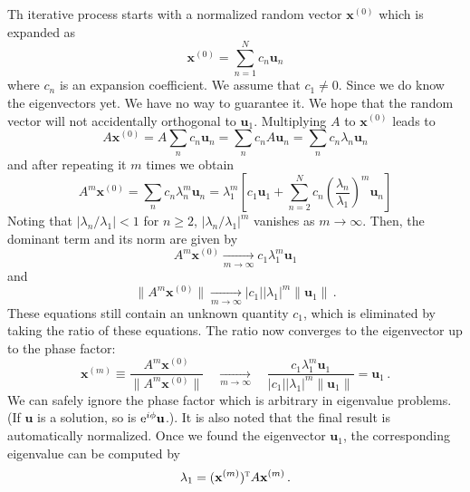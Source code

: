 Th iterative process starts with a normalized random vector $\mathbf{x}^{(0)}$ which is expanded as
\begin{equation}
\mathbf{x}^{(0)}= \sum_{n=1}^N c_n \mathbf{u}_n
\end{equation}
where $c_n$ is an expansion coefficient.  We assume that $c_1 \ne 0$.  Since we do know the eigenvectors yet.  We have no way to guarantee it.
We hope that the random vector will not accidentally orthogonal to $\mathbf{u}_1$.  Multiplying $A$ to $\mathbf{x}^{(0)}$ leads to
\begin{equation}
A \mathbf{x}^{(0)} = A \sum_n c_n \mathbf{u}_n = \sum_n c_n A \mathbf{u}_n = \sum_n c_n \lambda_n \mathbf{u}_n
\end{equation}
and after repeating it $m$ times we obtain
\begin{equation}
A^m \mathbf{x}^{(0)} = \sum_n c_n \lambda_n^m \mathbf{u}_n= \lambda_1^m \left [ c_1 \mathbf{u}_1 + \sum_{n=2}^N c_n \left ( \frac{\lambda_n}{\lambda_1} \right )^m
\mathbf{u}_n \right ]
\end{equation}
Noting that $|\lambda_n/\lambda_1|<1$ for $n\geq 2$, $|\lambda_n/\lambda_1|^m$ vanishes as $m \rightarrow \infty$.  Then, the dominant term and its norm are given by
\begin{equation}\label{eq:eigen_power}
A^m \mathbf{x}^{(0)} \xrightarrow[m \rightarrow \infty]{} c_1 \lambda_1^m \mathbf{u}_1
\end{equation}
and
\begin{equation}\label{eq:eqigen_power_norm}
\| A^m \mathbf{x}^{(0)}\| \xrightarrow[m \rightarrow \infty]{} |c_1| |\lambda_1|^m \|\mathbf{u}_1\|\,.
\end{equation}
These equations still contain an unknown quantity $c_1$, which is eliminated by taking the ratio of these equations.  The ratio now converges to the eigenvector up to the phase factor: 
\begin{equation}
\mathbf{x}^{(m)} \equiv \frac{A^m \mathbf{x}^{(0)}}{\|A^{m}\mathbf{x}^{(0)}\|} \quad
\xrightarrow[m \rightarrow \infty]{} \quad
\frac{c_1 \lambda_1^m \mathbf{u}_1}{|c_1| |\lambda_1|^m \|\mathbf{u}_1\|} 
= \mathbf{u}_1\,.
\end{equation}
We can safely ignore the phase factor which is arbitrary in eigenvalue problems. (If $\mathbf{u}$ is a solution, so is $\text{e}^{i \phi} \mathbf{u}$.).   It is also noted that the final result is automatically normalized. 
Once we found the eigenvector $\mathbf{u}_1$, the corresponding eigenvalue can be computed by
\begin{equation}
\lambda_1 = (\mathbf{x}^{(m)})^\textsc{t} A \mathbf{x}^{(m)}\,.
\end{equation}

